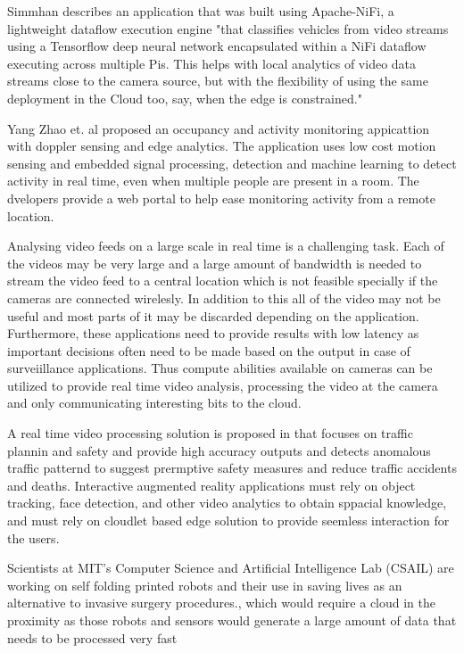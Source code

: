\documentclass[sigconf]{acmart}
\begin{document}
Simmhan describes an application that was built using Apache-NiFi, a lightweight dataflow execution engine "that classifies vehicles from video streams using a Tensorflow deep neural network encapsulated within a NiFi dataflow executing across multiple Pis. This helps with local analytics of video data streams close to the camera source, but with the flexibility of using the same deployment in the Cloud too, say, when the edge is constrained."\cite{ieee_iot_cloud_analytics_newsletter}

Yang Zhao et. al proposed an occupancy and activity monitoring appicattion with doppler sensing and edge analytics. The application uses low cost motion sensing and embedded signal processing, detection and machine learning to detect activity in real time, even when multiple people are present in a room. The dvelopers provide a web portal to help ease monitoring activity from a remote location.\citep{Dolppler-usecase}

Analysing video feeds on a large scale in real time is a challenging task. Each of the videos may be very large and a large amount of bandwidth is needed to stream the video feed to a central location which is not feasible specially if the cameras are connected wirelesly. In addition to this all of the video may not be useful and most parts of it may be discarded depending on the application. Furthermore, these applications need to provide results with low latency as important decisions often need to be made based on the output in case of surveiillance applications.\cite{rocket-real-time-video} Thus compute abilities available on cameras can be utilized to provide real time video analysis, processing the video at the camera and only communicating interesting bits to the cloud.\cite{satyanarayananemergence}

A real time video processing solution is proposed in \cite{rocket-real-time-video} that focuses on traffic plannin and safety and provide high accuracy outputs and detects anomalous traffic patternd to suggest prermptive safety measures and reduce traffic accidents and deaths.
Interactive augmented reality applications must rely on object tracking, face detection, and other video analytics to obtain sppacial knowledge, and must rely on cloudlet based edge solution to provide seemless interaction for the users.\cite{rocket-real-time-video}

Scientists at MIT's Computer Science and Artificial Intelligence Lab (CSAIL) are working on self folding printed robots and their use in saving lives as an alternative to invasive surgery procedures., which would require a cloud in the proximity as those robots and sensors would generate a large amount of data that needs to be processed very fast\cite{open_stack_living_on_edge}
\end{document}
